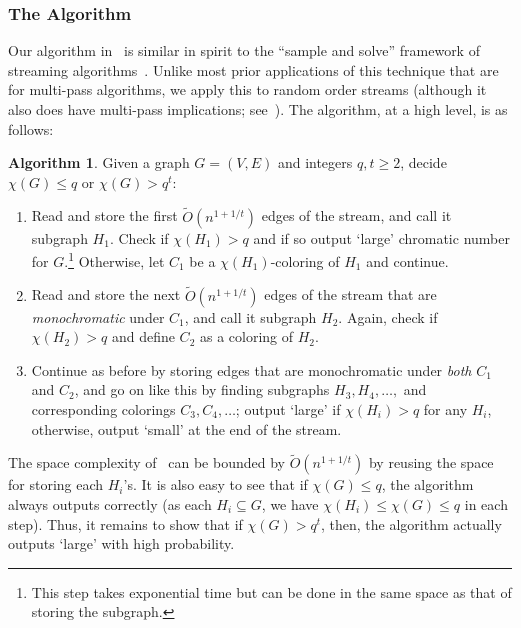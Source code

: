 \documentclass[11pt]{article}
\theoremstyle{definition}
\newenvironment{ourbox}{\begin{mdframed}[hidealllines=false,innerleftmargin=10pt,backgroundcolor=white!10,innertopmargin=5pt,innerbottommargin=5pt,roundcorner=10pt]}{\end{mdframed}}
\newtheorem{mdalgorithm}{Algorithm}
\newenvironment{Algorithm}{\begin{ourbox}\begin{mdalgorithm}}{\end{mdalgorithm}\end{ourbox}}
\renewcommand{\leq}{\leqslant}
\renewcommand{\geq}{\geqslant}
\newcommand{\Ot}{\ensuremath{\widetilde{O}}}
\begin{document}
\subsubsection{The Algorithm}
Our algorithm in~ is similar in spirit to the ``sample and solve'' framework of streaming algorithms~\cite{LattanziMSV11,KumarMVV13}. Unlike most prior applications of this technique that are for multi-pass algorithms, we apply this to random order streams (although it also does have multi-pass implications; see~). The algorithm, at a high level, is as follows: 
\begin{Algorithm}\label{alg:over-rand}
Given a graph $G=(V,E)$ and integers $q,t \geq 2$, decide $\chi(G) \leq q$ or $\chi(G) > q^t$: 
	\begin{enumerate}
	\item Read and store the first $\Ot(n^{1+1/t})$ edges of the stream, and call it subgraph $H_1$. Check if $\chi(H_1) > q$
	and if so output `large' chromatic number for $G$.\footnote{This step takes exponential time but can be done in the same space as that of storing the subgraph.} Otherwise, let $C_1$ be a $\chi(H_1)$-coloring of $H_1$ and continue. 
	\item Read and store the next $\Ot(n^{1+1/t})$ edges of the stream that are \emph{monochromatic} under $C_1$, and call it subgraph $H_2$.  Again, check if $\chi(H_2) > q$ and define $C_2$ as a coloring of $H_2$. 
	\item Continue as before by storing edges that are monochromatic under \emph{both} $C_1$ and $C_2$, and go on like this by finding subgraphs $H_3,H_4,\ldots,$ and corresponding colorings $C_3,C_4,\ldots$; output `large' if $\chi(H_i) > q$ for 
	any $H_i$, otherwise, output `small' at the end of the stream. 
	\end{enumerate}
\end{Algorithm}

The space complexity of~ can be bounded by $\Ot(n^{1+1/t})$ by reusing the space for storing each $H_i$'s. It is also easy to see that if $\chi(G) \leq q$, the algorithm always outputs correctly (as each $H_i \subseteq G$, we have 
$\chi(H_i) \leq \chi(G) \leq q$ in each step). Thus, it remains to show that if $\chi(G) > q^t$, then, the algorithm actually outputs `large' with high probability. 
\end{document}
